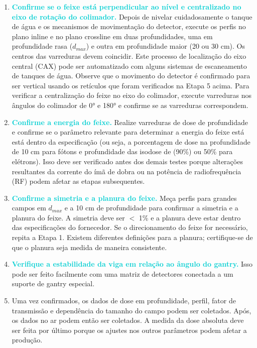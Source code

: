 \documentclass[11pt,a4paper]{article}
\begin{document}
	\begin{enumerate}[label=\textcolor{CarnationPink}{\arabic*${}^\circ $}]
		\item \textcolor{DarkTurquoise}{\textbf{Confirme se o feixe está perpendicular ao nível e centralizado no eixo de rotação do colimador.}} Depois de nivelar cuidadosamente o tanque de água e os mecanismos de movimentação do detector, execute os perfis no plano inline e no plano crossline em duas profundidades, uma em profundidade rasa ($d_{max}$) e outra em profundidade maior (20 ou 30 cm). Os centros das varreduras devem coincidir. Este processo de localização do eixo central (CAX) pode ser automatizado com alguns sistemas de escaneamento de tanques de água. Observe que o movimento do detector é confirmado para ser vertical usando os retículos que foram verificados na Etapa 5 acima. Para verificar a centralização do feixe no eixo do colimador, execute varreduras nos ângulos do colimador de \ang{0} e \ang{180} e confirme se as varreduras correspondem. 
		
		\item \textcolor{DarkTurquoise}{\textbf{Confirme a energia do feixe.}} Realize varreduras de dose de profundidade e confirme se o parâmetro relevante para determinar a energia do feixe está está dentro da especificação (ou seja, a porcentagem de dose na profundidade de 10 cm para fótons e profundidade das isodose de  (90\%) ou 50\%  para elétrons). Isso deve ser verificado antes dos demais testes porque alterações resultantes da corrente do ímã de dobra ou na potência de radiofrequência (RF) podem afetar as etapas subsequentes.
		
		\item \textcolor{DarkTurquoise}{\textbf{Confirme a simetria e a planura do feixe.}} Meça perfis para grandes campos em $d_{max}$ e a 10 cm de profundidade para confirmar a simetria e a planura do feixe. A simetria deve ser $<$ 1\% e a planura deve estar dentro das especificações do fornecedor. Se o direcionamento do feixe for necessário, repita a Etapa 1. Existem diferentes definições para a planura; certifique-se de que o planura seja medida de maneira consistente.
		
		\item \textcolor{DarkTurquoise}{\textbf{Verifique a estabilidade da viga em relação ao ângulo do gantry.}} Isso pode ser feito facilmente com uma matriz de detectores conectada a um suporte de gantry especial.
		
		\item Uma vez confirmados, os dados de dose em profundidade, perfil, fator de transmissão e dependência do tamanho do campo podem ser coletados. Após, os dados no ar podem então ser coletados. A medida da dose absoluta deve ser feita por último porque os ajustes nos outros parâmetros podem afetar a produção.
	
	\end{enumerate}
\end{document}
